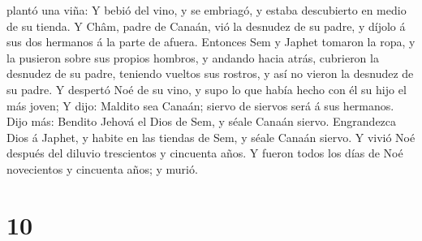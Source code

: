 plantó una viña:  Y bebió del vino, y se embriagó, y
estaba descubierto en medio de su tienda.  Y Châm, padre
de Canaán, vió la desnudez de su padre, y díjolo á sus dos hermanos á la
parte de afuera.  Entonces Sem y Japhet tomaron la ropa,
y la pusieron sobre sus propios hombros, y andando hacia atrás,
cubrieron la desnudez de su padre, teniendo vueltos sus rostros, y así
no vieron la desnudez de su padre.  Y despertó Noé de su
vino, y supo lo que había hecho con él su hijo el más joven;
 Y dijo: Maldito sea Canaán; siervo de siervos será á sus
hermanos.  Dijo más: Bendito Jehová el Dios de Sem, y
séale Canaán siervo.  Engrandezca Dios á Japhet, y habite
en las tiendas de Sem, y séale Canaán siervo.  Y vivió
Noé después del diluvio trescientos y cincuenta años.  Y
fueron todos los días de Noé novecientos y cincuenta años; y murió.

\hypertarget{section-9}{%
\section{10}\label{section-9}}

